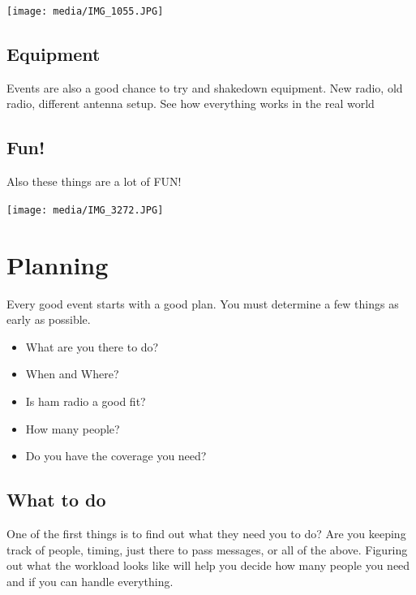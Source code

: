 \documentclass[11pt]{beamer}
\begin{document}
\begin{frame}
	\begin{center}
		\texttt{[image: media/IMG\_1055.JPG]}
	\end{center}

\end{frame}

\subsection{Equipment}

\begin{frame}
	Events are also a good chance to try and shakedown equipment. New radio, old radio, different antenna setup.
	See how everything works in the real world
\end{frame}

\subsection{Fun!}

\begin{frame}
	Also these things are a lot of FUN!
\end{frame}

\begin{frame}
	\begin{center}
		\texttt{[image: media/IMG\_3272.JPG]}
	\end{center}
\end{frame}
\section{Planning}

\begin{frame}
	Every good event starts with a good plan. You must determine a few things as early as possible.
	\begin{itemize}
		\item What are you there to do?
		\item When and Where?
		\item Is ham radio a good fit?
		\item How many people?
		\item Do you have the coverage you need?
	\end{itemize}
\end{frame}

\subsection{What to do}
\begin{frame}
	One of the first things is to find out what they need you to do? Are you keeping track of people, timing, just there to pass messages, or all of the above. Figuring out what the workload looks like will help you decide how many people you need and if you can handle everything.
\end{frame}
\end{document}
